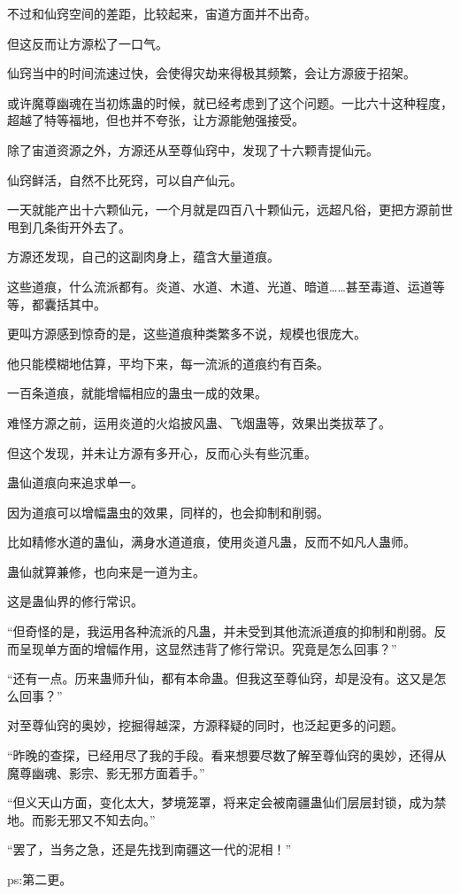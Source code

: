\begin{this_body}
不过和仙窍空间的差距，比较起来，宙道方面并不出奇。

但这反而让方源松了一口气。

仙窍当中的时间流速过快，会使得灾劫来得极其频繁，会让方源疲于招架。

或许魔尊幽魂在当初炼蛊的时候，就已经考虑到了这个问题。一比六十这种程度，超越了特等福地，但也并不夸张，让方源能勉强接受。

除了宙道资源之外，方源还从至尊仙窍中，发现了十六颗青提仙元。

仙窍鲜活，自然不比死窍，可以自产仙元。

一天就能产出十六颗仙元，一个月就是四百八十颗仙元，远超凡俗，更把方源前世甩到几条街开外去了。

方源还发现，自己的这副肉身上，蕴含大量道痕。

这些道痕，什么流派都有。炎道、水道、木道、光道、暗道……甚至毒道、运道等等，都囊括其中。

更叫方源感到惊奇的是，这些道痕种类繁多不说，规模也很庞大。

他只能模糊地估算，平均下来，每一流派的道痕约有百条。

一百条道痕，就能增幅相应的蛊虫一成的效果。

难怪方源之前，运用炎道的火焰披风蛊、飞烟蛊等，效果出类拔萃了。

但这个发现，并未让方源有多开心，反而心头有些沉重。

蛊仙道痕向来追求单一。

因为道痕可以增幅蛊虫的效果，同样的，也会抑制和削弱。

比如精修水道的蛊仙，满身水道道痕，使用炎道凡蛊，反而不如凡人蛊师。

蛊仙就算兼修，也向来是一道为主。

这是蛊仙界的修行常识。

“但奇怪的是，我运用各种流派的凡蛊，并未受到其他流派道痕的抑制和削弱。反而呈现单方面的增幅作用，这显然违背了修行常识。究竟是怎么回事？”

“还有一点。历来蛊师升仙，都有本命蛊。但我这至尊仙窍，却是没有。这又是怎么回事？”

对至尊仙窍的奥妙，挖掘得越深，方源释疑的同时，也泛起更多的问题。

“昨晚的查探，已经用尽了我的手段。看来想要尽数了解至尊仙窍的奥妙，还得从魔尊幽魂、影宗、影无邪方面着手。”

“但义天山方面，变化太大，梦境笼罩，将来定会被南疆蛊仙们层层封锁，成为禁地。而影无邪又不知去向。”

“罢了，当务之急，还是先找到南疆这一代的泥相！”

ps:第二更。

\end{this_body}

